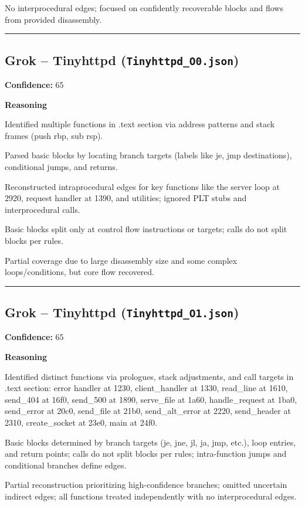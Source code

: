 No interprocedural edges; focused on confidently recoverable blocks and flows from provided disassembly.

\bigskip
\hrule
\bigskip

\subsection{Grok -- Tinyhttpd (\texttt{Tinyhttpd\_O0.json})}

\textbf{Confidence:} 65

\textbf{Reasoning}

Identified multiple functions in .text section via address patterns and stack frames (push rbp, sub rsp).

Parsed basic blocks by locating branch targets (labels like je, jmp destinations), conditional jumps, and returns.

Reconstructed intraprocedural edges for key functions like the server loop at 2920, request handler at 1390, and utilities; ignored PLT stubs and interprocedural calls.

Basic blocks split only at control flow instructions or targets; calls do not split blocks per rules.

Partial coverage due to large disassembly size and some complex loops/conditions, but core flow recovered.

\bigskip
\hrule
\bigskip

\subsection{Grok -- Tinyhttpd (\texttt{Tinyhttpd\_O1.json})}

\textbf{Confidence:} 65

\textbf{Reasoning}

Identified distinct functions via prologues, stack adjustments, and call targets in .text section: error handler at 1230, client\_handler at 1330, read\_line at 1610, send\_404 at 16f0, send\_500 at 1890, serve\_file at 1a60, handle\_request at 1ba0, send\_error at 20c0, send\_file at 21b0, send\_alt\_error at 2220, send\_header at 2310, create\_socket at 23e0, main at 24f0.

Basic blocks determined by branch targets (je, jne, jl, ja, jmp, etc.), loop entries, and return points; calls do not split blocks per rules; intra-function jumps and conditional branches define edges.

Partial reconstruction prioritizing high-confidence branches; omitted uncertain indirect edges; all functions treated independently with no interprocedural edges.

